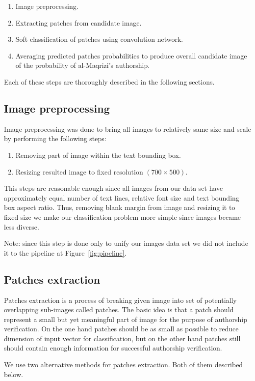 \documentclass[conference,a4paper]{ieeetran}
\begin{document}
\begin{enumerate}
	\item Image preprocessing.
	\item Extracting patches from candidate image.
	\item Soft classification of patches using convolution network.
	\item Averaging predicted patches probabilities to produce overall candidate image of the probability of al-Maqrizi's authorship.
\end{enumerate}

Each of these steps are thoroughly described in the following sections.	


\subsection{Image preprocessing}
Image preprocessing was done to bring all images to relatively same size and scale by performing the following steps:
\begin{enumerate}
	\item Removing part of image within the text bounding box.
	\item Resizing resulted image to fixed resolution $(700\times 500)$.
\end{enumerate}
This steps are reasonable enough since all images from our data set have approximately equal number of text lines, relative font size and text bounding box aspect ratio. Thus, removing blank margin from image and resizing it to fixed size we make our classification problem more simple since images became less diverse. 

Note: since this step is done only to unify our images data set we did not include it to the pipeline at Figure~\ref{fig:pipeline}.

\subsection{Patches extraction}
Patches extraction is a process of breaking given image into set of potentially overlapping sub-images called patches. The basic idea is that a patch should represent a small but yet meaningful part of image for the purpose of authorship verification. On the one hand patches should be as small as possible to reduce dimension of input vector for classification, but on the other hand patches still should contain enough information for successful authorship verification.  

We use two alternative methods for patches extraction. Both of them described below.
\end{document}
